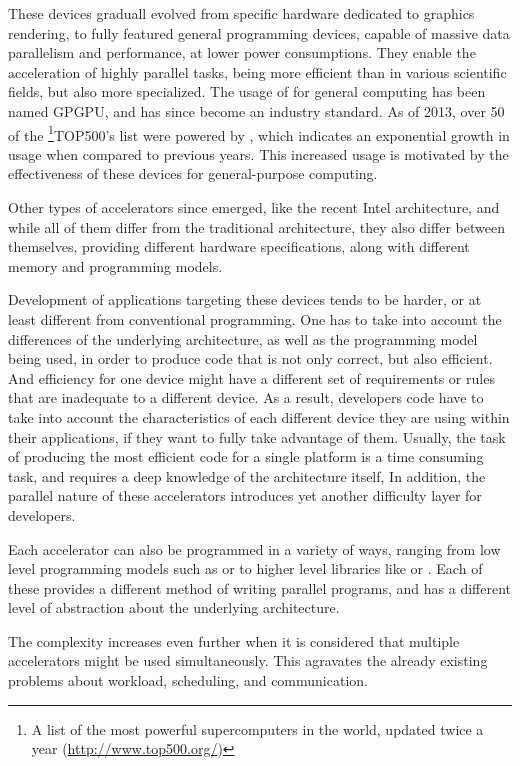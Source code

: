 \documentclass[main.tex]{subfiles}
\begin{document}
These devices graduall evolved from specific hardware dedicated to graphics rendering, to fully featured general programming devices, capable of massive data parallelism and performance, at lower power consumptions.
They enable the acceleration of highly parallel tasks, being more efficient than \cpus in various scientific fields, but also more specialized. The usage of \gpus for general computing has been named \ac{GPGPU}, and has since become an industry standard.
As of 2013, over 50 of the \footnote{A list of the most powerful supercomputers in the world, updated twice a year (\url{http://www.top500.org/})}{TOP500's} list were powered by \gpus, which indicates an exponential growth in usage when compared to previous years. This increased usage is motivated by the effectiveness of these devices for general-purpose computing.

Other types of accelerators since emerged, like the recent Intel \mic architecture, and while all of them differ from the traditional \cpu architecture, they also differ between themselves, providing different hardware specifications, along with different memory and programming models. 

Development of applications targeting these devices tends to be harder, or at least different from conventional programming. One has to take into account the differences of the underlying architecture, as well as the programming model being used, in order to produce code that is not only correct, but also efficient. And efficiency for one device might have a different set of requirements or rules that are inadequate to a different device. As a result, developers code have to take into account the characteristics of each different device they are using within their applications, if they want to fully take advantage of them. Usually, the task of producing the most efficient code for a single platform is a time consuming task, and requires a deep knowledge of the architecture itself, In addition, the parallel nature of these accelerators introduces yet another difficulty layer for developers.

Each accelerator can also be programmed in a variety of ways, ranging from low level programming models such as \cuda or \opencl to higher level libraries like \openmp or \openacc. Each of these provides a different method of writing parallel programs, and has a different level of abstraction about the underlying architecture.

The complexity increases even further when it is considered that multiple accelerators might be used simultaneously. This agravates the already existing problems about workload, scheduling, and communication.
\end{document}
